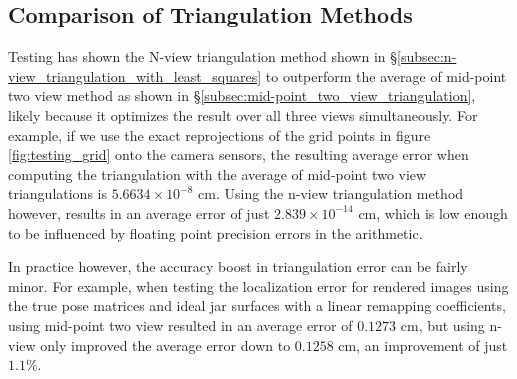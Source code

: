 \documentclass[11pt, letterpaper]{extarticle} %
\begin{document}
\subsection{Comparison of Triangulation Methods}\label{subsec:comparison_of_triangulation_methods}
Testing has shown the N-view triangulation method shown in \S\ref{subsec:n-view_triangulation_with_least_squares} to outperform the average of mid-point two view method as shown in \S\ref{subsec:mid-point_two_view_triangulation}, likely because it optimizes the result over all three views simultaneously. For example, if we use the exact reprojections of the grid points in figure \ref{fig:testing_grid} onto the camera sensors, the resulting average error when computing the triangulation with the average of mid-point two view triangulations is $5.6634 \times 10^{-8}$ cm. Using the n-view triangulation method however, results in an average error of just $2.839 \times 10^{-14}$ cm, which is low enough to be influenced by floating point precision errors in the arithmetic.

In practice however, the accuracy boost in triangulation error can be fairly minor. For example, when testing the localization error for rendered images using the true pose matrices and ideal jar surfaces with a linear remapping coefficients, using mid-point two view resulted in an average error of $0.1273$ cm, but using n-view only improved the average error down to $0.1258$ cm, an improvement of just $1.1\%$.
\end{document}
